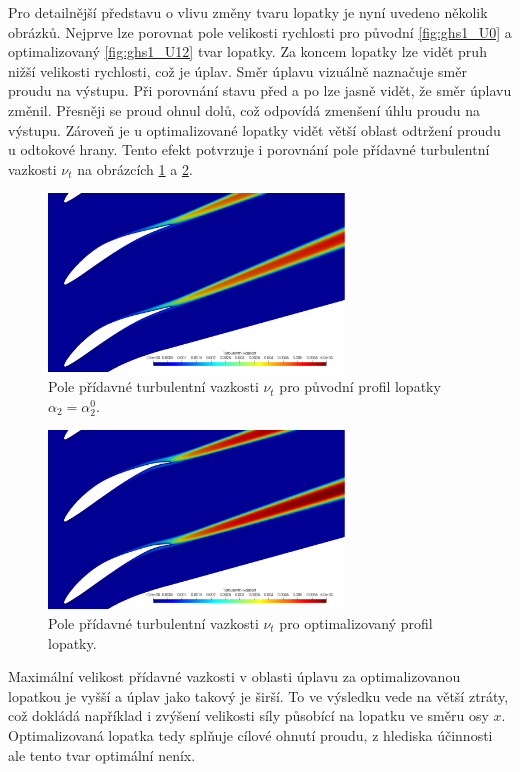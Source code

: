 Pro detailnější představu o vlivu změny tvaru lopatky je nyní uvedeno několik obrázků.
Nejprve lze porovnat pole velikosti rychlosti pro původní \ref{fig:ghs1_U0} a optimalizovaný \ref{fig:ghs1_U12} tvar lopatky. 
Za koncem lopatky lze vidět pruh nižší velikosti rychlosti, což je úplav. Směr úplavu vizuálně naznačuje směr proudu na výstupu. Při porovnání stavu před a po lze jasně vidět, že směr úplavu změnil. Přesněji se proud ohnul dolů, což odpovídá zmenšení úhlu proudu na výstupu. Zároveň je u optimalizované lopatky vidět větší oblast odtržení proudu u odtokové hrany. Tento efekt potvrzuje i porovnání pole přídavné turbulentní vazkosti $ \nu_t $ na obrázcích \ref{fig:ghs1_nut0} a \ref{fig:ghs1_nut12}. 
\begin{figure}[h]
	\includegraphics[width=0.7\textwidth]{img/nut_0.png}
	\caption[Turbulentní vazkost pro původní lopatku]{Pole přídavné turbulentní vazkosti $ \nu_t $ pro původní profil lopatky $ \alpha_{2}=\alpha_2^0 $.}
	\label{fig:ghs1_nut0}
\end{figure}
\begin{figure}[h]
	\includegraphics[width=0.7\textwidth]{img/nut_12.png}
	\caption[Turbulentní vazkost pro optimalizovanou lopatku]{Pole přídavné turbulentní vazkosti $ \nu_t $ pro optimalizovaný profil lopatky.}
	\label{fig:ghs1_nut12}
\end{figure}
Maximální velikost přídavné vazkosti v oblasti úplavu za optimalizovanou lopatkou je vyšší a úplav jako takový je širší. To ve výsledku vede na větší ztráty, což dokládá například i zvýšení velikosti síly působící na lopatku ve směru osy $ x $. Optimalizovaná lopatka tedy splňuje cílové ohnutí proudu, z hlediska účinnosti ale tento tvar optimální neníx.
